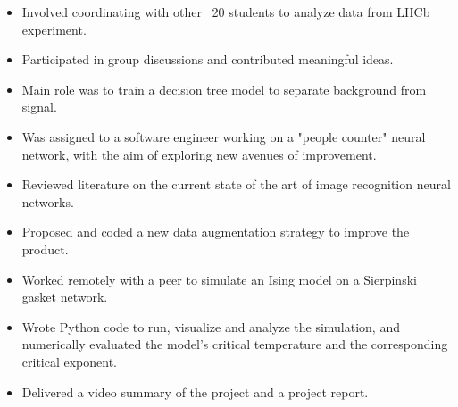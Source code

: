 \documentclass{res}[12pt] %
\begin{document}
\begin{resume}
\begin{itemize}
\item Involved coordinating with other ~20 students to analyze data from LHCb experiment.
\item Participated in group discussions and contributed meaningful ideas.
\item Main role was to train a decision tree model to separate background from signal.
\end{itemize}


\begin{itemize}
\item Was assigned to a software engineer working on a "people counter" neural network, with the aim of exploring new avenues of improvement.
\item Reviewed literature on the current state of the art of image recognition neural networks.
\item Proposed and coded a new data augmentation strategy to improve the product.
\end{itemize}

\begin{itemize}
\item Worked remotely with a peer to simulate an Ising model on a Sierpinski gasket network.
\item Wrote Python code to run, visualize and analyze the simulation, and numerically evaluated the model's critical temperature and the corresponding critical exponent.
\item Delivered a video summary of the project and a project report.
\end{itemize}


 

\newpage
{}
\sectionRule
\vspace{6pt} %


\end{resume}
\end{document}
